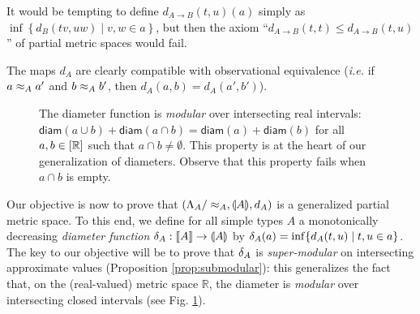 It would be tempting to define $d_{A \to B}(t,u)(a)$ simply as $\inf \left\{ d_B(tv, uw) \mid v,w \in a \right\}$, but then the axiom ``$d_{A \to B}(t,t) \leq d_{A \to B}(t,u)$'' of partial metric spaces would fail.

The maps $d_{A}$ are clearly compatible with observational equivalence (\textit{i.e.} if $a \approx_A a'$ and $b \approx_A b'$, then $d_A(a,b) = d_A(a',b')$). 


\begin{figure}
\caption{\small The diameter function is \emph{modular} over intersecting real intervals: 
$\mathsf{diam}(a\cup  b)+\mathsf{diam}(a\cap b)=\mathsf{diam}(a)+\mathsf{diam}(b)$ for all $a,b\in [\mathbb{R}]$ such that $a\cap b\neq \emptyset$.
This property is at the heart of our generalization of diameters. Observe that this property fails when $a\cap b$ is empty.}
\label{fig:modular}
\end{figure}


Our objective is now to prove that $\left(\Lambda_A/\approx_A, \llparenthesis A \rrparenthesis, d_A\right)$ is a generalized partial metric space.
To this end, we define for all simple types $A$ a monotonically decreasing \emph{diameter function} $\delta_A : \llbracket A \rrbracket \to \llparenthesis A \rrparenthesis$ by $\delta_A(a) = \inf \{ d_A(t,u) \mid t,u \in a \}$. The key to our objective will be to prove that $\delta_{A}$ is \emph{super-modular} on intersecting approximate values (Proposition \ref{prop:submodular}): this generalizes the fact that, on the (real-valued) metric space $\mathbb{R}$, the diameter is \emph{modular} over intersecting closed intervals (see Fig. \ref{fig:modular}).
 
